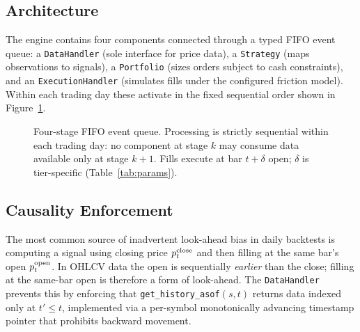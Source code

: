 \documentclass[12pt]{article}
\begin{document}
\subsection{Architecture}

\begin{sloppypar}
The engine contains four components connected through a typed FIFO
event queue: a \texttt{DataHandler} (sole interface for price data),
a \texttt{Strategy} (maps observations to signals), a \texttt{Portfolio}
(sizes orders subject to cash constraints), and an
\texttt{ExecutionHandler} (simulates fills under the configured friction
model). Within each trading day these activate in the fixed sequential
order shown in Figure~\ref{fig:architecture}.
\end{sloppypar}

\begin{figure}[H]
\centering
{}
\caption{Four-stage FIFO event queue. Processing is strictly sequential
within each trading day: no component at stage $k$ may consume data
available only at stage $k+1$. Fills execute at bar $t+\delta$
open; $\delta$ is tier-specific (Table~\ref{tab:params}).}
\label{fig:architecture}
\end{figure}

\subsection{Causality Enforcement}

The most common source of inadvertent look-ahead bias in daily backtests
is computing a signal using closing price $p^{\rm close}_t$ and then
filling at the same bar's open $p^{\rm open}_t$. In OHLCV data the open
is sequentially \emph{earlier} than the close; filling at the same-bar
open is therefore a form of look-ahead. The \texttt{DataHandler} prevents
this by enforcing that \texttt{get\_history\_asof}$(s, t)$ returns data
indexed only at $t' \le t$, implemented via a per-symbol monotonically
advancing timestamp pointer that prohibits backward movement.
\end{document}
